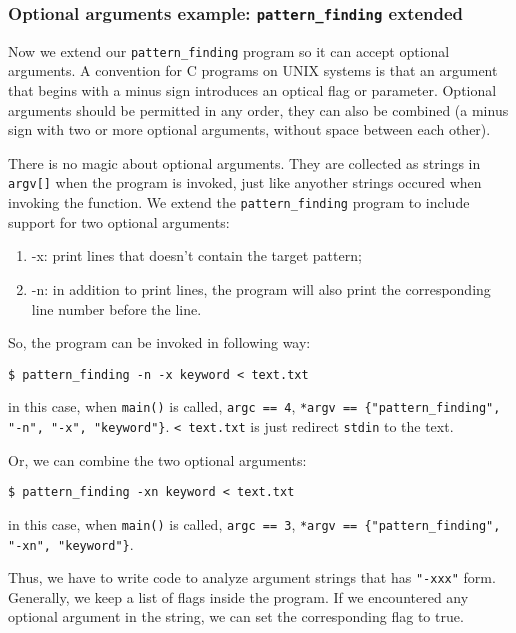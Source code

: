 \documentclass[12pt]{article}
\begin{document}
\subsubsection{Optional arguments example: \texttt{pattern\_finding} extended}
\label{sec:org5289820}
Now we extend our \texttt{pattern\_finding} program so it can accept optional arguments. A convention for C programs on UNIX systems is that an argument that begins with a minus sign introduces an optical flag or parameter. Optional arguments should be permitted in any order, they can also be combined (a minus sign with two or more optional arguments, without space between each other).

There is no magic about optional arguments. They are collected as strings in \texttt{argv[]} when the program is invoked, just like anyother strings occured when invoking the function. We extend the \texttt{pattern\_finding} program to include support for two optional arguments:
\begin{enumerate}
\item -x: print lines that doesn't contain the target pattern;
\item -n: in addition to print lines, the program will also print the corresponding line number before the line.
\end{enumerate}
So, the program can be invoked in following way:
\begin{verbatim}
$ pattern_finding -n -x keyword < text.txt
\end{verbatim}
in this case, when \texttt{main()} is called, \texttt{argc == 4}, \texttt{*argv == \{"pattern\_finding", "-n", "-x", "keyword"\}}. \texttt{< text.txt} is just redirect \texttt{stdin} to the text.

Or, we can combine the two optional arguments:
\begin{verbatim}
$ pattern_finding -xn keyword < text.txt
\end{verbatim}
in this case, when \texttt{main()} is called, \texttt{argc == 3}, \texttt{*argv == \{"pattern\_finding", "-xn", "keyword"\}}.

Thus, we have to write code to analyze argument strings that has \texttt{"-xxx"} form. Generally, we keep a list of flags inside the program. If we encountered any optional argument in the string, we can set the corresponding flag to true.
\end{document}
